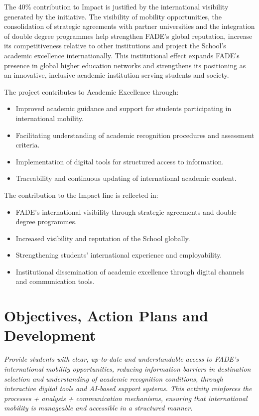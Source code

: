\documentclass[11pt,a4paper]{scrreprt}
\begin{document}
The 40\% contribution to Impact is justified by the international visibility generated by the initiative. The visibility of mobility opportunities, the consolidation of strategic agreements with partner universities and the integration of double degree programmes help strengthen FADE's global reputation, increase its competitiveness relative to other institutions and project the School's academic excellence internationally. This institutional effect expands FADE's presence in global higher education networks and strengthens its positioning as an innovative, inclusive academic institution serving students and society.



\small
The project contributes to Academic Excellence through:

\begin{itemize}[noitemsep,topsep=2pt]
\item Improved academic guidance and support for students participating in international mobility.
\item Facilitating understanding of academic recognition procedures and assessment criteria.
\item Implementation of digital tools for structured access to information.
\item Traceability and continuous updating of international academic content.
\end{itemize}



\small
The contribution to the Impact line is reflected in:

\begin{itemize}[noitemsep,topsep=2pt]
\item FADE's international visibility through strategic agreements and double degree programmes.
\item Increased visibility and reputation of the School globally.
\item Strengthening students' international experience and employability.
\item Institutional dissemination of academic excellence through digital channels and communication tools.
\end{itemize}
\newpage
{}
\section{Objectives, Action Plans and Development}
{\small\color{mutedcolor}\itshape Provide students with clear, up-to-date and understandable access to FADE's international mobility opportunities, reducing information barriers in destination selection and understanding of academic recognition conditions, through interactive digital tools and AI-based support systems. This activity reinforces the processes + analysis + communication mechanisms, ensuring that international mobility is manageable and accessible in a structured manner. }\par\vspace{6pt}
\end{document}
